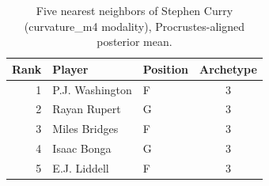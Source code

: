 \begin{table}[htbp]
  \centering\small
  \begin{tabular}{rllc}
    \toprule
    Rank & Player & Position & Archetype \\
    \midrule
    1 & P.J. Washington & F & 3 \\
    2 & Rayan Rupert & G & 3 \\
    3 & Miles Bridges & F & 3 \\
    4 & Isaac Bonga & G & 3 \\
    5 & E.J. Liddell & F & 3 \\
    \bottomrule
  \end{tabular}
  \caption{Five nearest neighbors of Stephen Curry (curvature_m4 modality), Procrustes-aligned posterior mean.}
  \label{tab:Stephen_Curry_neighbors_curvature_m4}
\end{table}


